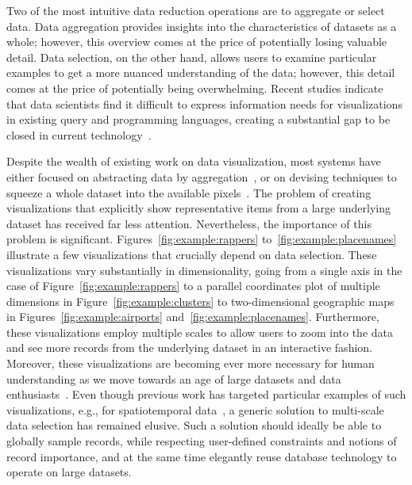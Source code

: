 \documentclass[11pt, oneside]{report}
\begin{document}
{Two of the most intuitive data reduction operations are to aggregate or select data. Data aggregation provides insights into the characteristics of datasets as a whole; however, this overview comes at the price of potentially losing valuable detail. Data selection, on the other hand, allows users to examine particular examples to get a more nuanced understanding of the data; however, this detail comes at the price of potentially being overwhelming. Recent studies indicate that data scientists find it difficult to express information needs for visualizations in existing query and programming languages, creating a substantial gap to be closed in current technology~\cite{kandel2012interviewstudy}.
 
Despite the wealth of existing work on data visualization, most systems have either focused on abstracting data by aggregation~\cite{blais2014generating,lins2013nanocubes,stolte2003multiscale,vartak2014seedb}, or on devising techniques to squeeze a whole dataset into the available pixels~\cite{keim1995visdb,kruskal1978multidimensional}. The problem of creating visualizations that explicitly show representative items from a large underlying dataset has received far less attention. Nevertheless, the importance of this problem is significant. Figures~\ref{fig:example:rappers} to~\ref{fig:example:placenames} illustrate a few visualizations that crucially depend on data selection. These visualizations vary substantially in dimensionality, going from a single axis in the case of Figure~\ref{fig:example:rappers} to a parallel coordinates plot of multiple dimensions in Figure~\ref{fig:example:clusters} to two-dimensional geographic maps in Figures~\ref{fig:example:airports} and~\ref{fig:example:placenames}. Furthermore, these visualizations employ multiple scales to allow users to zoom into the data and see more records from the underlying dataset in an interactive fashion. Moreover, these visualizations are becoming ever more necessary for human understanding as we move towards an age of large datasets and data enthusiasts~\cite{hanrahan2012enthusiast,markl2014breaking}. Even though previous work has targeted particular examples of such visualizations, e.g., for spatiotemporal data~\cite{jugel2014m4,kefaloukos2014declarative,sarma2012fusiontables}, a generic solution to multi-scale data selection has remained elusive. Such a solution should ideally be able to globally sample records, while respecting user-defined constraints and notions of record importance, and at the same time elegantly reuse database technology to operate on large datasets.   

}
\end{document}
